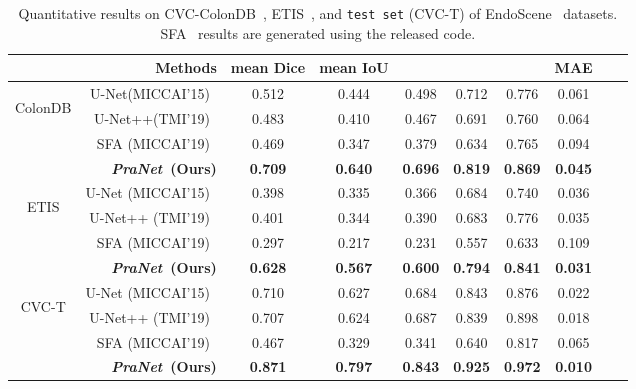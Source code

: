\documentclass[runningheads]{llncs}
\def\ourmodel{\textit{PraNet}}
\begin{document}
\begin{table*}[t!]
  \centering
  \scriptsize
  \renewcommand{\arraystretch}{1.1}
  \setlength\tabcolsep{5pt}
  \caption{ Quantitative results on CVC-ColonDB~\cite{tajbakhsh2015automated}, ETIS~\cite{silva2014toward}, and {\tt test set} (CVC-T) of EndoScene~\cite{vazquez2017benchmark} datasets. SFA~\cite{fang2019selective} results are generated using the released code.
  }\label{tab:Generalizability}
  \begin{tabular}{cr||cccccccc}
  \hline
  \rowcolor{mygray}
  &Methods & mean Dice & mean IoU  &   & & & MAE\\
  \hline
  \multirow{4}{*}{\begin{sideways}ColonDB\end{sideways}} & 
  U-Net(MICCAI'15)~\cite{ronneberger2015u}  & 0.512 & 0.444 & 0.498 & 0.712 & 0.776 & 0.061 \\
  &U-Net++(TMI'19)~\cite{zhou2018unetplus} & 0.483 & 0.410 & 0.467 & 0.691 & 0.760 & 0.064 \\
&SFA (MICCAI'19)~\cite{fang2019selective} & 0.469 & 0.347 & 0.379 & 0.634 & 0.765 & 0.094\\
&\textbf{\ourmodel~(Ours)} & \textbf{0.709} & \textbf{0.640} & \textbf{0.696} & \textbf{0.819} & \textbf{0.869} & \textbf{0.045}\\
  \hline
  \hline
  \multirow{4}{*}{\begin{sideways}ETIS\end{sideways}} &
  U-Net (MICCAI'15)~\cite{ronneberger2015u}  & 0.398 & 0.335 & 0.366 & 0.684 & 0.740 & 0.036 \\
  &U-Net++ (TMI'19)~\cite{zhou2018unetplus}  & 0.401 & 0.344 & 0.390 & 0.683 & 0.776 & 0.035 \\
&SFA (MICCAI'19)~\cite{fang2019selective} & 0.297 & 0.217 & 0.231 & 0.557 & 0.633 & 0.109\\
&\textbf{\ourmodel~(Ours)}  & \textbf{0.628} & \textbf{0.567} & \textbf{0.600} & \textbf{0.794}  & \textbf{0.841} & \textbf{0.031}\\
  \hline
  \hline
  \multirow{4}{*}{\begin{sideways}CVC-T\end{sideways}} &
  U-Net (MICCAI'15)~\cite{ronneberger2015u}  & 0.710 & 0.627 & 0.684 & 0.843 & 0.876 & 0.022\\
  &U-Net++ (TMI'19)~\cite{zhou2018unetplus}   & 0.707 & 0.624 & 0.687 & 0.839 & 0.898 & 0.018\\
&SFA (MICCAI'19)~\cite{fang2019selective} & 0.467 & 0.329 & 0.341 & 0.640 & 0.817 & 0.065\\
&\textbf{\ourmodel~(Ours)}  & \textbf{0.871} & \textbf{0.797} & \textbf{0.843} & \textbf{0.925} & \textbf{0.972} & \textbf{0.010} \\
  \hline
\end{tabular}
\end{table*}
\end{document}

